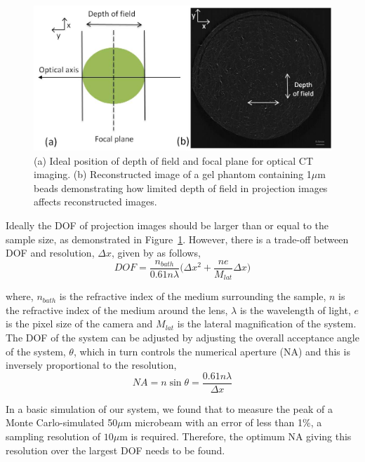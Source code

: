 \documentclass[12pt]{article}
\begin{document}
\begin{figure}
\centering
\includegraphics[width=0.9\linewidth]{Fig5}
\caption{(a) Ideal position of depth of field and focal plane for optical CT imaging. (b) Reconstructed image of a gel phantom containing 1$\mu$m beads demonstrating how limited depth of field in projection images affects reconstructed images.}
\label{fig:Fig5}
\end{figure}



Ideally the DOF of projection images should be larger than or equal to the sample size, as demonstrated in Figure~\ref{fig:Fig5}. However, there is a trade-off between DOF and resolution,  $\Delta x$, given by \cite{inoue1997video} as follows,
\begin{equation}
DOF = \frac{n_{bath}}{0.61 n \lambda} \big(\Delta x^2 + \frac{ne}{M_{lat}} \Delta x \big)
\label{eqn:1DOF}
\end{equation}

where, $n_{bath}$ is the refractive index of the medium surrounding the sample, $n$ is the refractive index of the medium around the lens, $\lambda$ is the wavelength of light, $e$ is the pixel size of the camera and $M_{lat}$ is the lateral magnification of the system. The DOF of the system can be adjusted by adjusting the overall acceptance angle of the system, $\theta$, which in turn controls the numerical aperture (NA) and this is inversely proportional to the resolution, 
\begin{equation}
NA = n \sin \theta = \frac{0.61n\lambda}{\Delta x}
\label{eqn:2NA}
\end{equation}

In a basic simulation of our system, we found that to measure the peak of a Monte Carlo-simulated 50$\mu$m microbeam with an error of less than 1\%, a sampling resolution of $10\mu$m is required. Therefore, the optimum NA giving this resolution over the largest DOF needs to be found.  
\end{document}
